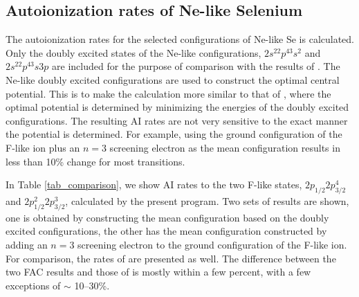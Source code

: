 \documentclass[preprint, floatfix, pra, showpacs, showkeys]{revtex4}
\begin{document}
\subsection{Autoionization rates of Ne-like Selenium}
The autoionization rates for the selected configurations of Ne-like Se is
calculated. Only the doubly excited states of the Ne-like configurations, 
$2s^22p^43s^2$ and $2s^22p^43s3p$ are included for the purpose of comparison
with the results of \textcite{oreg91}. The Ne-like doubly excited
configurations are used to construct the optimal central potential. This is to
make the calculation 
more similar to that of \textcite{oreg91}, where the optimal potential is
determined by minimizing the energies of the doubly excited configurations.
The resulting AI rates are not very sensitive to the exact manner the potential
is determined. For example, using the ground configuration of the F-like ion
plus an $n = 3$ screening electron as the mean configuration results in
less than 10\% change for most transitions.

In Table \ref{tab_comparison}, we show AI rates to the two F-like
states, $2p_{1/2}2p^4_{3/2}$ and $2p^2_{1/2}2p^3_{3/2}$, calculated by the
present program. Two sets of results are shown, one is obtained by constructing
the mean configuration based on the doubly excited configurations, the other
has the mean configuration constructed by adding an $n = 3$ screening electron
to the ground configuration of the F-like ion. For comparison, the rates of
\textcite{oreg91} are presented as 
well. The difference between the two FAC results and those of \textcite{oreg91}
is mostly within a few percent, with a few exceptions of $\sim$ 10--30\%. 
 
\end{document}
